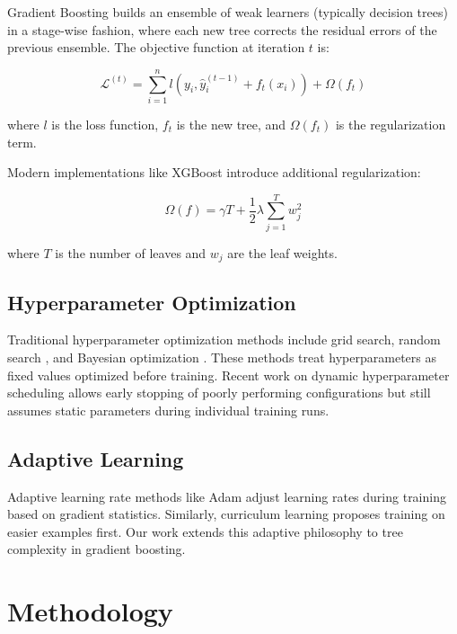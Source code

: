 \documentclass[conference]{IEEEtran}
\begin{document}
Gradient Boosting \cite{friedman2001greedy} builds an ensemble of weak learners (typically decision trees) in a stage-wise fashion, where each new tree corrects the residual errors of the previous ensemble. The objective function at iteration $t$ is: 

\begin{equation}
\mathcal{L}^{(t)} = \sum_{i=1}^{n} l(y_i, \hat{y}_i^{(t-1)} + f_t(x_i)) + \Omega(f_t)
\end{equation}

where $l$ is the loss function, $f_t$ is the new tree, and $\Omega(f_t)$ is the regularization term.

Modern implementations like XGBoost \cite{chen2016xgboost} introduce additional regularization: 

\begin{equation}
\Omega(f) = \gamma T + \frac{1}{2}\lambda \sum_{j=1}^{T} w_j^2
\end{equation}

where $T$ is the number of leaves and $w_j$ are the leaf weights.

\subsection{Hyperparameter Optimization}

Traditional hyperparameter optimization methods include grid search, random search \cite{bergstra2012random}, and Bayesian optimization \cite{snoek2012practical}. These methods treat hyperparameters as fixed values optimized before training. Recent work on dynamic hyperparameter scheduling \cite{li2017hyperband} allows early stopping of poorly performing configurations but still assumes static parameters during individual training runs.

\subsection{Adaptive Learning}

Adaptive learning rate methods like Adam \cite{kingma2014adam} adjust learning rates during training based on gradient statistics. Similarly, curriculum learning \cite{bengio2009curriculum} proposes training on easier examples first.  Our work extends this adaptive philosophy to tree complexity in gradient boosting.

\section{Methodology}
\end{document}

